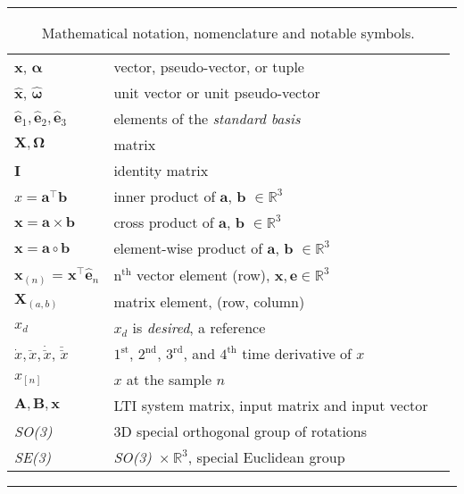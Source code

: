 \begin{table*}[!h]
  \scriptsize
  \centering
  \noindent\rule{\textwidth}{0.5pt}
  \begin{tabular}{lll}
    $\mathbf{x}$, $\bm{\alpha}$ & vector, pseudo-vector, or tuple\\
    $\mathbf{\hat{x}}$, $\bm{\hat{\omega}}$& unit vector or unit pseudo-vector\\
    $\mathbf{\hat{e}}_1, \mathbf{\hat{e}}_2, \mathbf{\hat{e}}_3$ & elements of the \emph{standard basis} \\
    $\mathbf{X}, \bm{\Omega}$ & matrix \\
    $\mathbf{I}$ & identity matrix \\
    $x = \mathbf{a}^\intercal\mathbf{b}$ & inner product of $\mathbf{a}$, $\mathbf{b}$ $\in \mathbb{R}^3$\\
    $\mathbf{x} = \mathbf{a}\times\mathbf{b}$ & cross product of $\mathbf{a}$, $\mathbf{b}$ $\in \mathbb{R}^3$\\
    $\mathbf{x} = \mathbf{a}\circ\mathbf{b}$ & element-wise product of $\mathbf{a}$, $\mathbf{b}$ $\in \mathbb{R}^3$ \\
    $\mathbf{x}_{(n)}$ = $\mathbf{x}^\intercal\mathbf{\hat{e}}_n$ & $\mathrm{n}^{\mathrm{th}}$ vector element (row), $\mathbf{x}, \mathbf{e} \in \mathbb{R}^3$\\
    $\mathbf{X}_{(a,b)}$ & matrix element, (row, column)\\
    $x_{d}$ & $x_d$ is \emph{desired}, a reference\\
    $\dot{x}, \ddot{x}, \dot{\ddot{x}}$, $\ddot{\ddot{x}}$ & ${1^{\mathrm{st}}}$, ${2^{\mathrm{nd}}}$, ${3^{\mathrm{rd}}}$, and ${4^{\mathrm{th}}}$ time derivative of $x$\\
    $x_{[n]}$ & $x$ at the sample $n$ \\
    $\mathbf{A}, \mathbf{B}, \mathbf{x}$ & LTI system matrix, input matrix and input vector\\
    \emph{SO(3)} & 3D special orthogonal group of rotations\\
    \emph{SE(3)} & \emph{SO(3)}~$\times~\mathbb{R}^3$, special Euclidean group\\
  \end{tabular}
  \noindent\rule{\textwidth}{0.5pt}
  \caption{Mathematical notation, nomenclature and notable symbols.}
  \label{tab:mathematical_notation}
\end{table*}
